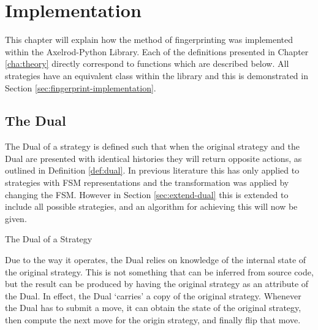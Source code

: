 
\chapter{Implementation}\label{cha:implementation}

This chapter will explain how the method of fingerprinting was implemented within the Axelrod-Python Library.
Each of the definitions presented in Chapter \ref{cha:theory} directly correspond to functions which are described below.
All strategies have an equivalent class within the library and this is demonstrated in Section \ref{sec:fingerprint-implementation}.




\section{The Dual}
The Dual of a strategy is defined such that when the original strategy and the Dual are presented with identical histories they will return opposite actions, as outlined in Definition \ref{def:dual}.
In previous literature this has only applied to strategies with FSM representations \cite{Ashlock2008, Ashlock2010, Ashlock2004,  Ashlock2005, Ashlock2009, Ashlock2006} and the transformation was applied by changing the FSM.
However in Section \ref{sec:extend-dual} this is extended to include all possible strategies, and an algorithm for achieving this will now be given.

\begin{algorithm}[H]
    \caption{The Dual of a Strategy}
\end{algorithm}

Due to the way it operates, the Dual relies on knowledge of the internal state of the original strategy.
This is not something that can be inferred from source code, but the result can be produced by having the original strategy as an attribute of the Dual.
In effect, the Dual `carries' a copy of the original strategy.
Whenever the Dual has to submit a move, it can obtain the state of the original strategy, then compute the next move for the origin strategy, and finally flip that move.



